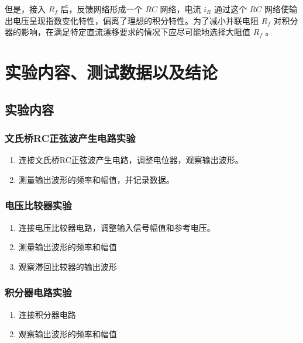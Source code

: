 \documentclass[10pt, a4paper]{article} %
\begin{document}
但是，接入  $ R_f $  后，反馈网络形成一个  $ RC $  网络，电流  $ i_R $  通过这个  $ RC $  网络使输出电压呈现指数变化特性，偏离了理想的积分特性。为了减小并联电阻  $ R_f $  对积分器的影响，在满足特定直流漂移要求的情况下应尽可能地选择大阻值  $ R_f $ 。



\section{实验内容、测试数据以及结论}

\subsection{实验内容}

\subsubsection{文氏桥RC正弦波产生电路实验}
\begin{enumerate}[leftmargin=50pt,label=(\arabic*)] %
    \item 连接文氏桥RC正弦波产生电路，调整电位器，观察输出波形。
    \item 测量输出波形的频率和幅值，并记录数据。
\end{enumerate}
\subsubsection{电压比较器实验}
\begin{enumerate}[leftmargin=50pt,label=(\arabic*)] %
    \item 连接电压比较器电路，调整输入信号幅值和参考电压。
    \item 测量输出波形的频率和幅值
    \item 观察滞回比较器的输出波形
\end{enumerate}

\subsubsection{积分器电路实验}
\begin{enumerate}[leftmargin=50pt,label=(\arabic*)] %
    \item 连接积分器电路
    \item 观察输出波形的频率和幅值
\end{enumerate}
\end{document}
